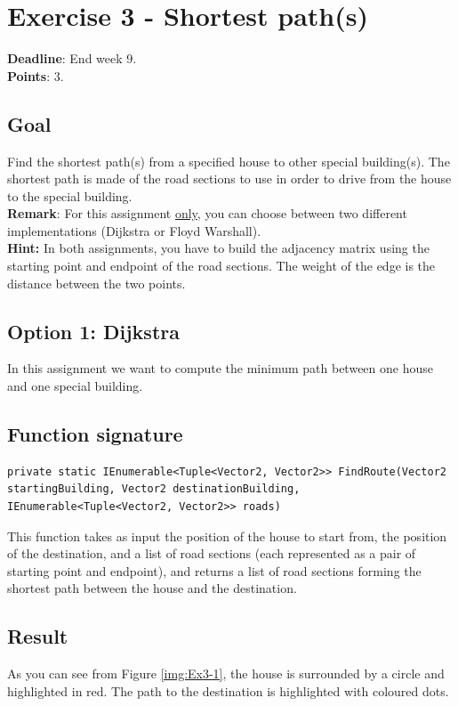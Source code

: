 \documentclass[10pt,a4paper]{article}
\begin{document}
\section*{Exercise 3 - Shortest path(s)}
\textbf{Deadline}: End week 9. \\
\textbf{Points}: 3.


\subsection*{Goal}
Find the shortest path(s) from a specified house to other special building(s). The shortest path is made of the road sections to use in order to drive from the house to the special building.\\
\textbf{Remark}: For this assignment \underline{only}, you can choose between two different implementations (Dijkstra or Floyd Warshall).\\
\textbf{Hint:} In both assignments, you have to build the adjacency matrix using the starting point and endpoint of the road sections. The weight of the edge is the distance between the two points.

\subsection*{Option 1: Dijkstra}
In this assignment we want to compute the minimum path between one house and one special building. 

\subsection*{Function signature} 
\begin{lstlisting}
private static IEnumerable<Tuple<Vector2, Vector2>> FindRoute(Vector2 startingBuilding, Vector2 destinationBuilding, IEnumerable<Tuple<Vector2, Vector2>> roads)
\end{lstlisting}

\noindent
This function takes as input the position of the house to start from, the position of the destination, and a list of road sections (each represented as a pair of starting point and endpoint), and returns a list of road sections forming the shortest path between the house and the destination.\\

\subsection*{Result} 
As you can see from Figure \ref{img:Ex3-1}, the house is surrounded by a circle and highlighted in red. The path to the destination is highlighted with coloured dots.
\end{document}
